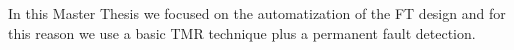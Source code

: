 {{	    In this Master Thesis we focused on the automatization of the FT design and for this reason we use a basic TMR technique plus a permanent fault detection.
	} %
%			
%			
%			
%			
}